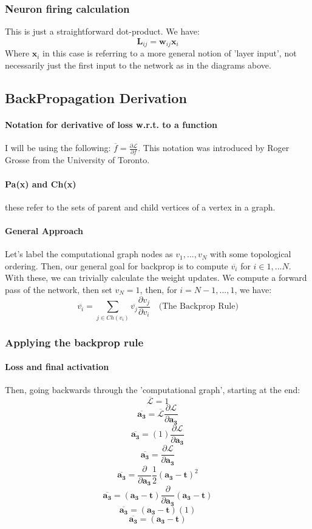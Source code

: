 \documentclass{article}
\begin{document}
\subsubsection{Neuron firing calculation} This is just a straightforward dot-product. We have:
\[\bm{L}_{ij}=\bm{w}_{ij}\bm{x}_i \]
Where $\bm{x}_i$ in this case is referring to a more general notion of 'layer input', not necessarily just the first input to the network as in the diagrams above.
\subsection{BackPropagation Derivation}
\paragraph{Notation for derivative of loss w.r.t. to a function} I will be using the following: $\overline{f} = \frac{\partial{\mathcal{L}}}{\partial{f}}$. This notation was introduced by Roger Grosse from the University of Toronto.
\paragraph{Pa(x) and Ch(x)} these refer to the sets of parent and child vertices of a vertex in a graph.
\paragraph{General Approach} Let's label the computational graph nodes as $v_1,...,v_N$ with some topological ordering. 
Then, our general goal for backprop is to compute $\overline{v_i}$ for $i \in {1,...N}$. With these, we can trivially calculate the weight updates.
We compute a forward pass of the network, then set $v_N=1$, then, for $i=N-1, ... , 1$, we have:
\begin{equation}
    \overline{v_i} = \sum_{j \in Ch(v_i)} \overline{v_j} \frac{\partial{v_j}}{\partial{v_i}} \quad  \text{(The Backprop Rule)}
\end{equation}
\subsubsection{Applying the backprop rule}
\paragraph{Loss and final activation}
Then, going backwards through the 'computational graph', starting at the end:
\begin{equation}\overline{\mathcal{L}} = 1\end{equation}
\[\overline{\bm{a_3}} = \overline{\mathcal{L}} \frac{\partial{\mathcal{L}}}{\partial{\bm{a_3}}}\]
\[\overline{\bm{a_3}} = (1) \frac{\partial{\mathcal{L}}}{\partial{\bm{a_3}}}\]
\[\overline{\bm{a_3}} = \frac{\partial{\mathcal{L}}}{\partial{\bm{a_3}}}\]
\[\overline{\bm{a_3}} = \frac{\partial}{\partial{\bm{a_3}}} \frac{1}{2}(\bm{a_3} - \bm{t})^{2}\]
\[\overline{\bm{a_3}} = (\bm{a_3} - \bm{t}) \frac{\partial}{\partial{\bm{a_3}}} (\bm{a_3} - \bm{t})\]
\[\overline{\bm{a_3}} = (\bm{a_3} - \bm{t}) (1)\]
\begin{equation}
\overline{\bm{a_3}} = (\bm{a_3} - \bm{t})
\end{equation}
\end{document}
